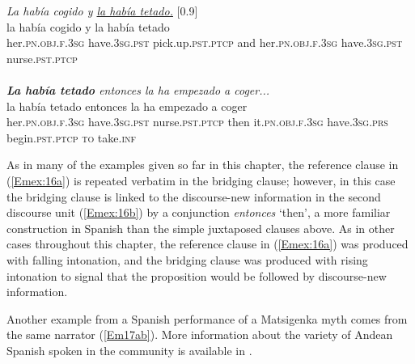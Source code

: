 \documentclass[output=paper]{LSP/langsci}
\begin{document}
\begin{exe}
\ex \label{Em16ab}
\begin{xlist}
\ex \label{Emex:16a}
\glt \textit{La había cogido y  \underline{la había tetado.}} [0.9]\\
\gll la había cogido y la había tetado\\
 her\textsc{.pn.obj.f.3sg} have\textsc{.3sg.pst} pick.up\textsc{.pst.ptcp} and her\textsc{.pn.obj.f.3sg} have\textsc{.3sg.pst} nurse\textsc{.pst.ptcp}\\
\glt {}\\
\ex \label{Emex:16b}
\glt \textit{\textbf{La había tetado} entonces la ha empezado a coger...}\\
\gll la había tetado entonces la ha empezado a coger\\     	      
    her\textsc{.pn.obj.f.3sg} have\textsc{.3sg.pst} nurse\textsc{.pst.ptcp} then it\textsc{.pn.obj.f.3sg} have\textsc{.3sg.prs} begin\textsc{.pst.ptcp} \textsc{to} take\textsc{.inf}\\
\glt {}
\end{xlist}
\end{exe}


%
As in many of the examples given so far in this chapter, the reference clause in (\ref{Emex:16a}) is repeated verbatim in the bridging clause; however, in this case the bridging clause is linked to the discourse-new information in the second discourse unit (\ref{Emex:16b}) by a conjunction \textit{entonces} `then', a more familiar construction in Spanish than the simple juxtaposed clauses above. As in other cases throughout this chapter, the reference clause in (\ref{Emex:16a}) was produced with falling intonation, and the bridging clause was produced with rising intonation to signal that the proposition would be followed by discourse-new information.


Another example from a Spanish performance of a Matsigenka myth comes from the same narrator (\ref{Em17ab}). More information about the variety of Andean Spanish spoken in the community is available in \citet{emlenforth}.
%
\end{document}
